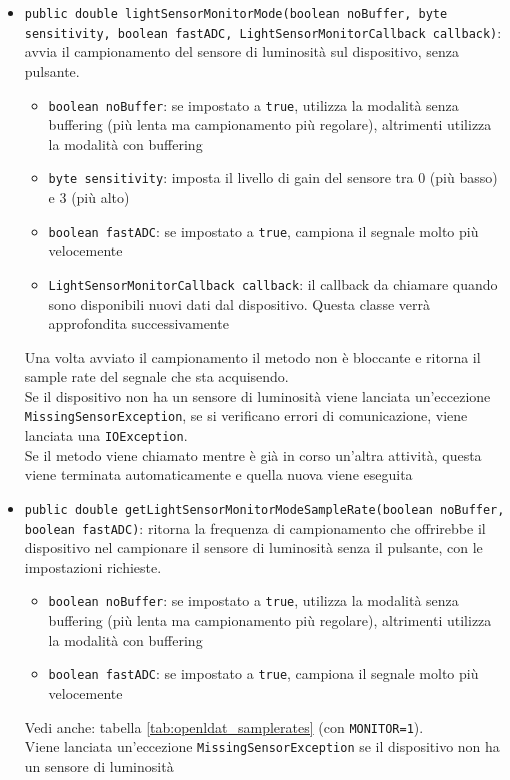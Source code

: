 \begin{itemize}
	\item \texttt{public double lightSensorMonitorMode(boolean noBuffer, byte sensitivity, boolean fastADC, LightSensorMonitorCallback callback)}: avvia il campionamento del sensore di luminosità sul dispositivo, senza pulsante.\begin{itemize}
		\item \texttt{boolean noBuffer}: se impostato a \texttt{true}, utilizza la modalità senza buffering (più lenta ma campionamento più regolare), altrimenti utilizza la modalità con buffering
		\item \texttt{byte sensitivity}: imposta il livello di gain del sensore tra 0 (più basso) e 3 (più alto)
		\item \texttt{boolean fastADC}: se impostato a \texttt{true}, campiona il segnale molto più velocemente
		\item \texttt{LightSensorMonitorCallback callback}: il callback da chiamare quando sono disponibili nuovi dati dal dispositivo. Questa classe verrà approfondita successivamente
	\end{itemize}
	Una volta avviato il campionamento il metodo non è bloccante e ritorna il sample rate del segnale che sta acquisendo.\\
	Se il dispositivo non ha un sensore di luminosità viene lanciata un'eccezione \texttt{MissingSensorException}, se si verificano errori di comunicazione, viene lanciata una \texttt{IOException}.\\
	Se il metodo viene chiamato mentre è già in corso un'altra attività, questa viene terminata automaticamente e quella nuova viene eseguita
	\item \texttt{public double getLightSensorMonitorModeSampleRate(boolean noBuffer, boolean fastADC)}: ritorna la frequenza di campionamento che offrirebbe il dispositivo nel campionare il sensore di luminosità senza il pulsante, con le impostazioni richieste.\begin{itemize}
		\item \texttt{boolean noBuffer}: se impostato a \texttt{true}, utilizza la modalità senza buffering (più lenta ma campionamento più regolare), altrimenti utilizza la modalità con buffering
		\item \texttt{boolean fastADC}: se impostato a \texttt{true}, campiona il segnale molto più velocemente
	\end{itemize}
	Vedi anche: tabella \ref{tab:openldat_samplerates} (con \texttt{MONITOR=1}).\\
	Viene lanciata un'eccezione \texttt{MissingSensorException} se il dispositivo non ha un sensore di luminosità

\end{itemize}
